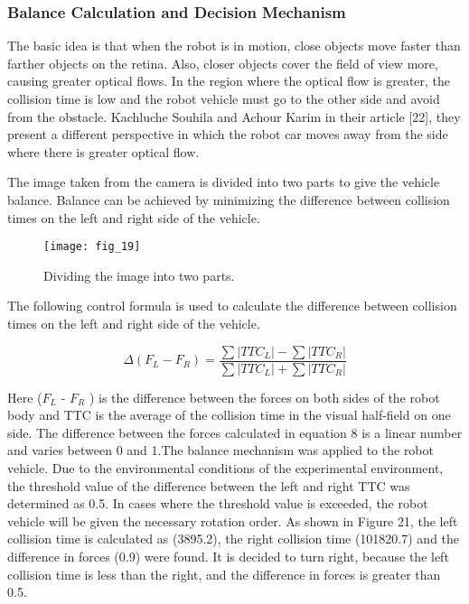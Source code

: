 \documentclass[twocolumn, switch]{article} %
\begin{document}
\subsubsection{Balance Calculation and Decision Mechanism}

The basic idea is that when the robot is in motion, close
objects move faster than farther objects on the retina. Also,
closer objects cover the field of view more, causing greater
optical flows. In the region where the optical flow is greater,
the collision time is low and the robot vehicle must go to the
other side and avoid from the obstacle. Kachluche Souhila
and Achour Karim in their article [22], they present a
different perspective in which the robot car moves away
from the side where there is greater optical flow.

The image taken from the camera is divided into two parts to
give the vehicle balance. Balance can be achieved by
minimizing the difference between collision times on the left
and right side of the vehicle.

\begin{figure}[h]
    \centering
    \texttt{[image: fig\_19]}
    \caption{Dividing the image into two parts.}
    \label{fig:fig19}
\end{figure}

The following control formula is used to calculate the
difference between collision times on the left and right side
of the vehicle.

\begin{equation}
	\Delta(F_L-F_R) = \frac{\sum |TTC_L| - \sum |TTC_R|}{\sum |TTC_L| + \sum |TTC_R|}
\end{equation}

Here ($F_L$ - $F_R$ ) is the difference between the forces on both
sides of the robot body and TTC is the average of the
collision time in the visual half-field on one side. The
difference between the forces calculated in equation 8 is a
linear number and varies between 0 and 1.The balance
mechanism was applied to the robot vehicle. Due to the
environmental conditions of the experimental environment,
the threshold value of the difference between the left and
right TTC was determined as 0.5. In cases where the
threshold value is exceeded, the robot vehicle will be given
the necessary rotation order. As shown in Figure 21, the left
collision time is calculated as (3895.2), the right collision
time (101820.7) and the difference in forces (0.9) were
found. It is decided to turn right, because the left collision
time is less than the right, and the difference in forces is
greater than 0.5.
\end{document}
